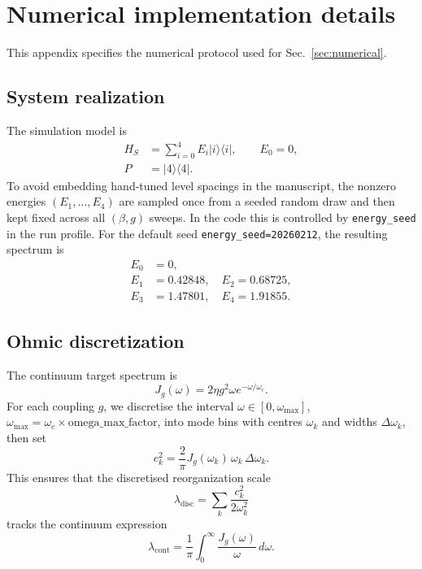 \section{Numerical implementation details}
\label{app:numerics_implementation}

This appendix specifies the numerical protocol used for
Sec.~\ref{sec:numerical}.

\subsection{System realization}

The simulation model is
\begin{align}
H_S&=\sum_{i=0}^{4}E_i\lvert i\rangle\!\langle i\rvert,\qquad E_0=0,\\
P&=\lvert 4\rangle\!\langle 4\rvert.
\end{align}
To avoid embedding hand-tuned level spacings in the manuscript, the nonzero
energies $(E_1,\ldots,E_4)$ are sampled once from a seeded random draw and then
kept fixed across all $(\beta,g)$ sweeps. In the code this is controlled by
\texttt{energy\_seed} in the run profile. For the default seed
\texttt{energy\_seed=20260212}, the resulting spectrum is
\begin{equation}
\begin{aligned}
E_0&=0, \\
E_1&=0.42848,\quad E_2=0.68725,\\
E_3&=1.47801,\quad E_4=1.91855.
\end{aligned}
\end{equation}

\subsection{Ohmic discretization}

The continuum target spectrum is
\begin{equation}
J_g(\omega)=2\eta g^2\omega e^{-\omega/\omega_c}.
\end{equation}
For each coupling $g$, we discretise the interval
$\omega\in[0,\omega_{\max}]$, $\omega_{\max}=\omega_c\times\text{omega\_max\_factor}$,
into mode bins with centres $\omega_k$ and widths $\Delta\omega_k$, then set
\begin{equation}
c_k^2=\frac{2}{\pi}J_g(\omega_k)\,\omega_k\,\Delta\omega_k.
\end{equation}
This ensures that the discretised reorganization scale
\begin{equation}
\lambda_{\mathrm{disc}}=\sum_k\frac{c_k^2}{2\omega_k^2}
\end{equation}
tracks the continuum expression
\begin{equation}
\lambda_{\mathrm{cont}}=\frac{1}{\pi}\int_0^\infty\frac{J_g(\omega)}{\omega}\,d\omega.
\end{equation}

